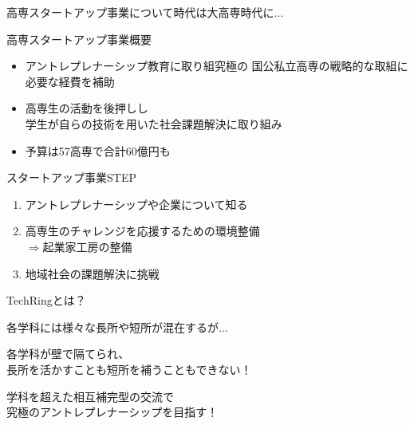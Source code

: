 \documentclass[dvipdfmx]{beamer}
\begin{document}
\begin{frame}{高専スタートアップ事業について}{時代は大高専時代に...}

  \begin{alertblock}{高専スタートアップ事業概要}
      \begin{itemize}
        \setlength{\itemsep}{1mm}
        \item アントレプレナーシップ教育に取り組究極の
        国公私立高専の戦略的な取組に必要な経費を補助
        \item 高専生の活動を後押しし\\
        学生が自らの技術を用いた社会課題解決に取り組み
        \item 予算は57高専で合計\alert{60億円}も
      \end{itemize}
  \end{alertblock}

  \begin{center}
  \end{center}

  \vspace{-3.5mm}

  \begin{greyblock}{スタートアップ事業STEP}
    \begin{enumerate}
      \setlength{\itemsep}{1mm}
      \item アントレプレナーシップや企業について知る
      \item 高専生のチャレンジを応援するための環境整備\\
      $\Rightarrow$\alert{起業家工房}の整備
      \item 地域社会の課題解決に挑戦
    \end{enumerate}
  \end{greyblock}
\end{frame}

\begin{frame}{TechRingとは？}
    \begin{description}[一つの輪に]
      \item[学科の壁] 各学科には様々な長所や短所が混在するが...\par
      各学科が壁で隔てられ、\\長所を活かすことも短所を補うこともできない！\par
      \hspace{0.3\textwidth}
      \vspace{-1.5mm}
      \item[一つの輪に] 学科を超えた相互補完型の交流で\\究極のアントレプレナーシップを目指す！
    \end{description}

\end{frame}
\end{document}
